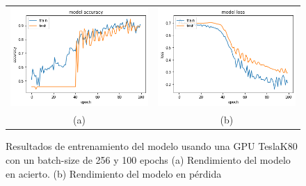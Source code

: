 \begin{figure}
    \centering
    \begin{tabular}{cc}
        \includegraphics[height=0.35\textwidth]{images/chapter5/batch_256_100_epoch.png} &
        \includegraphics[height=0.35\textwidth]{images/chapter5/batch_256_100_epoch_loss.png}\\
        (a) & (b)\\
    \end{tabular}
    \label{fig:Resultados de entrenamiento con un batch-size de 256 y 100 epochs}
    \caption{Resultados de entrenamiento del modelo usando una GPU TeslaK80 con un batch-size de 256 y 100 epochs (a) Rendimiento del modelo en acierto. (b) Rendimiento del modelo en pérdida}
\end{figure}

